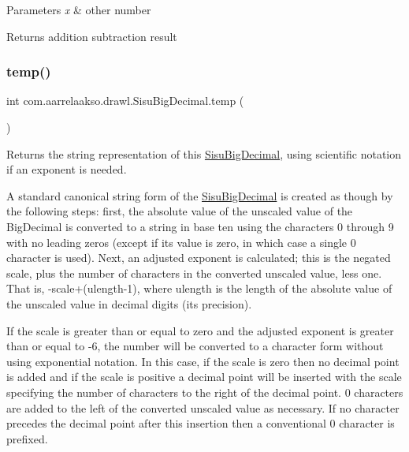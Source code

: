 \begin{DoxyParams}{Parameters}
{\em x} & other number \\
\hline
\end{DoxyParams}
\begin{DoxyReturn}{Returns}
addition subtraction result 
\end{DoxyReturn}
\mbox{\label{classcom_1_1aarrelaakso_1_1drawl_1_1_sisu_big_decimal_a17c66373817c4e977bbd7a579246be60}} 
\subsubsection{\texorpdfstring{temp()}{temp()}}
{\footnotesize\ttfamily int com.\+aarrelaakso.\+drawl.\+Sisu\+Big\+Decimal.\+temp (\begin{DoxyParamCaption}{ }\end{DoxyParamCaption})\hspace{0.3cm}{\ttfamily [private]}}



Returns the string representation of this \hyperlink{classcom_1_1aarrelaakso_1_1drawl_1_1_sisu_big_decimal}{Sisu\+Big\+Decimal}, using scientific notation if an exponent is needed. 

A standard canonical string form of the \hyperlink{classcom_1_1aarrelaakso_1_1drawl_1_1_sisu_big_decimal}{Sisu\+Big\+Decimal} is created as though by the following steps\+: first, the absolute value of the unscaled value of the Big\+Decimal is converted to a string in base ten using the characters \textquotesingle{}0\textquotesingle{} through \textquotesingle{}9\textquotesingle{} with no leading zeros (except if its value is zero, in which case a single \textquotesingle{}0\textquotesingle{} character is used). Next, an adjusted exponent is calculated; this is the negated scale, plus the number of characters in the converted unscaled value, less one. That is, -\/scale+(ulength-\/1), where ulength is the length of the absolute value of the unscaled value in decimal digits (its precision). 

If the scale is greater than or equal to zero and the adjusted exponent is greater than or equal to -\/6, the number will be converted to a character form without using exponential notation. In this case, if the scale is zero then no decimal point is added and if the scale is positive a decimal point will be inserted with the scale specifying the number of characters to the right of the decimal point. \textquotesingle{}0\textquotesingle{} characters are added to the left of the converted unscaled value as necessary. If no character precedes the decimal point after this insertion then a conventional \textquotesingle{}0\textquotesingle{} character is prefixed. 


